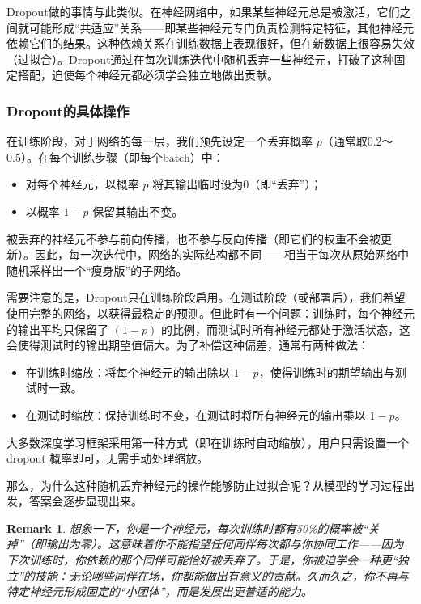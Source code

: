 \documentclass[lang=cn,zihao=-4,a4paper,fontset=windows]{beautybook}
\newtheorem*{remark}{\textbf{Remark}}
\begin{document}
Dropout做的事情与此类似。在神经网络中，如果某些神经元总是被激活，它们之间就可能形成“共适应”关系——即某些神经元专门负责检测特定特征，其他神经元依赖它们的结果。这种依赖关系在训练数据上表现很好，但在新数据上很容易失效（过拟合）。Dropout通过在每次训练迭代中随机丢弃一些神经元，打破了这种固定搭配，迫使每个神经元都必须学会独立地做出贡献。

\subsubsection*{Dropout的具体操作}

在训练阶段，对于网络的每一层，我们预先设定一个丢弃概率 \(p\)（通常取0.2～0.5）。在每个训练步骤（即每个batch）中：
\begin{itemize}
    \item 对每个神经元，以概率 \(p\) 将其输出临时设为0（即“丢弃”）；
    \item 以概率 \(1-p\) 保留其输出不变。
\end{itemize}
被丢弃的神经元不参与前向传播，也不参与反向传播（即它们的权重不会被更新）。因此，每一次迭代中，网络的实际结构都不同——相当于每次从原始网络中随机采样出一个“瘦身版”的子网络。

需要注意的是，Dropout只在训练阶段启用。在测试阶段（或部署后），我们希望使用完整的网络，以获得最稳定的预测。但此时有一个问题：训练时，每个神经元的输出平均只保留了 \((1-p)\) 的比例，而测试时所有神经元都处于激活状态，这会使得测试时的输出期望值偏大。为了补偿这种偏差，通常有两种做法：
\begin{itemize}
    \item 在训练时缩放：将每个神经元的输出除以 \(1-p\)，使得训练时的期望输出与测试时一致。
    \item 在测试时缩放：保持训练时不变，在测试时将所有神经元的输出乘以 \(1-p\)。
\end{itemize}
大多数深度学习框架采用第一种方式（即在训练时自动缩放），用户只需设置一个 dropout 概率即可，无需手动处理缩放。

那么，为什么这种随机丢弃神经元的操作能够防止过拟合呢？从模型的学习过程出发，答案会逐步显现出来。

\begin{remark}
想象一下，你是一个神经元，每次训练时都有50\%的概率被“关掉”（即输出为零）。这意味着你不能指望任何同伴每次都与你协同工作——因为下次训练时，你依赖的那个同伴可能恰好被丢弃了。于是，你被迫学会一种更“独立”的技能：无论哪些同伴在场，你都能做出有意义的贡献。久而久之，你不再与特定神经元形成固定的“小团体”，而是发展出更普适的能力。
\end{remark}
\end{document}
